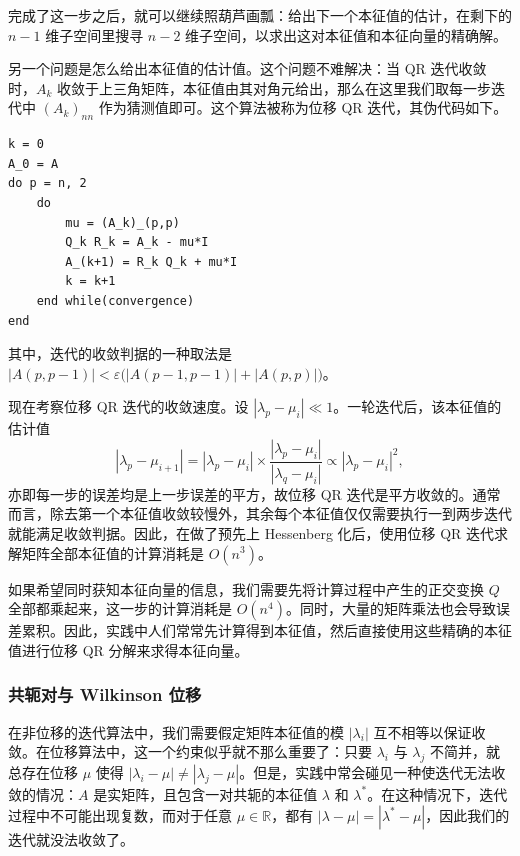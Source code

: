 完成了这一步之后，就可以继续照葫芦画瓢：给出下一个本征值的估计，在剩下的 $n-1$ 维子空间里搜寻 $n-2$ 维子空间，以求出这对本征值和本征向量的精确解。

另一个问题是怎么给出本征值的估计值。这个问题不难解决：当 QR 迭代收敛时，$A_k$ 收敛于上三角矩阵，本征值由其对角元给出，那么在这里我们取每一步迭代中 $(A_k)_{nn}$ 作为猜测值即可。这个算法被称为位移 QR 迭代，其伪代码如下。

\begin{algorithmBox}[算法 3.17\quad 位移 QR 迭代]
\begin{lstlisting}[style=bellacode]
k = 0
A_0 = A
do p = n, 2
    do
        mu = (A_k)_(p,p)
        Q_k R_k = A_k - mu*I
        A_(k+1) = R_k Q_k + mu*I
        k = k+1
    end while(convergence)
end
\end{lstlisting}
\end{algorithmBox}

其中，迭代的收敛判据的一种取法是 $|A(p,p-1)|<\varepsilon\bigl(|A(p-1,p-1)|+|A(p,p)|\bigr)$。

现在考察位移 QR 迭代的收敛速度。设 $|\lambda_p-\mu_i|\ll1$。一轮迭代后，该本征值的估计值
\[
|\lambda_p-\mu_{i+1}|
=|\lambda_p-\mu_i|\times\frac{|\lambda_p-\mu_i|}{|\lambda_q-\mu_i|}
\propto |\lambda_p-\mu_i|^2,
\]
亦即每一步的误差均是上一步误差的平方，故位移 QR 迭代是平方收敛的。通常而言，除去第一个本征值收敛较慢外，其余每个本征值仅仅需要执行一到两步迭代就能满足收敛判据。因此，在做了预先上 Hessenberg 化后，使用位移 QR 迭代求解矩阵全部本征值的计算消耗是 $O(n^3)$。

如果希望同时获知本征向量的信息，我们需要先将计算过程中产生的正交变换 $Q$ 全部都乘起来，这一步的计算消耗是 $O(n^4)$。同时，大量的矩阵乘法也会导致误差累积。因此，实践中人们常常先计算得到本征值，然后直接使用这些精确的本征值进行位移 QR 分解来求得本征向量。

\subsubsection{共轭对与 Wilkinson 位移}

在非位移的迭代算法中，我们需要假定矩阵本征值的模 $|\lambda_i|$ 互不相等以保证收敛。在位移算法中，这一个约束似乎就不那么重要了：只要 $\lambda_i$ 与 $\lambda_j$ 不简并，就总存在位移 $\mu$ 使得 $|\lambda_i-\mu|\ne|\lambda_j-\mu|$。但是，实践中常会碰见一种使迭代无法收敛的情况：$A$ 是实矩阵，且包含一对共轭的本征值 $\lambda$ 和 $\lambda^*$。在这种情况下，迭代过程中不可能出现复数，而对于任意 $\mu\in\mathbb R$，都有 $|\lambda-\mu|=|\lambda^*-\mu|$，因此我们的迭代就没法收敛了。

